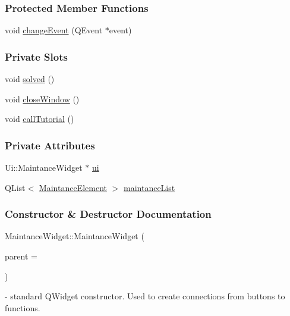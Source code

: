 \subsubsection*{Protected Member Functions}
\begin{DoxyCompactItemize}
\item 
void \mbox{\hyperlink{classMaintanceWidget_ac88ccb3da3c15f85575eb5d973004827}{change\+Event}} (Q\+Event $\ast$event)
\end{DoxyCompactItemize}
\subsubsection*{Private Slots}
\begin{DoxyCompactItemize}
\item 
void \mbox{\hyperlink{classMaintanceWidget_ae0e57574f94ec4b744247d15ff8a4891}{solved}} ()
\item 
void \mbox{\hyperlink{classMaintanceWidget_a239e4ddf537bfc43124ba4688fe285d0}{close\+Window}} ()
\item 
void \mbox{\hyperlink{classMaintanceWidget_adc20de8af45f910289c60d1f6656e783}{call\+Tutorial}} ()
\end{DoxyCompactItemize}
\subsubsection*{Private Attributes}
\begin{DoxyCompactItemize}
\item 
Ui\+::\+Maintance\+Widget $\ast$ \mbox{\hyperlink{classMaintanceWidget_a6a78c78ed723107e438c0919d1feae00}{ui}}
\item 
Q\+List$<$ \mbox{\hyperlink{classMaintanceElement}{Maintance\+Element}} $>$ \mbox{\hyperlink{classMaintanceWidget_a9c9003f07e28f258c99b996c3c02da45}{maintance\+List}}
\end{DoxyCompactItemize}


\subsubsection{Constructor \& Destructor Documentation}
\mbox{\label{classMaintanceWidget_a8e8a76199a50d91c200eb1d7dcc66a14}} 
{\footnotesize\ttfamily Maintance\+Widget\+::\texorpdfstring{Maintance\+Widget}{MaintanceWidget} (\begin{DoxyParamCaption}\item[{Q\+Widget $\ast$}]{parent = {} }\end{DoxyParamCaption})\hspace{0.3cm}{\ttfamily [explicit]}} - standard Q\+Widget constructor. Used to create connections from buttons to functions.

